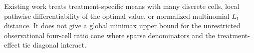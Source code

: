 Existing work treats treatment-specific means with many discrete cells, local pathwise differentiability of the optimal value, or normalized multinomial \(L_1\) distance.  It does not give a global minimax upper bound for the unrestricted observational four-cell ratio cone where sparse denominators and the treatment-effect tie diagonal interact.